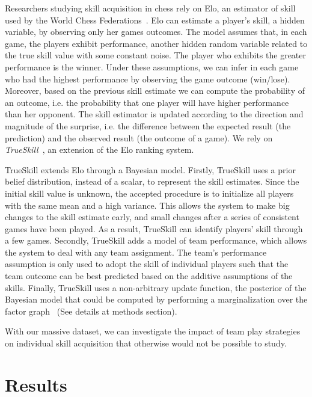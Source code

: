\documentclass[a4paper,10pt]{book}
\theoremstyle{definition}
\begin{document}
Researchers studying skill acquisition in chess rely on Elo, an estimator of skill used by the World Chess Federations~\cite{glickman1995-guideToChessRatings,glickman2001}.
Elo can estimate a player's skill, a hidden variable, by observing only her games outcomes.
The model assumes that, in each game, the players exhibit performance, another hidden random variable related to the true skill value with some constant noise.
The player who exhibits the greater performance is the winner.
Under these assumptions, we can infer in each game who had the highest performance by observing the game outcome (win/lose).
Moreover, based on the previous skill estimate we can compute the probability of an outcome, i.e. the probability that one player will have higher performance than her opponent.
The skill estimator is updated according to the direction and magnitude of the surprise, i.e. the difference between the expected result (the prediction) and the observed result (the outcome of a game).
We rely on \emph{TrueSkill}~\cite{Herbrich2007}, an extension of the Elo ranking system.

TrueSkill extends Elo through a Bayesian model.
Firstly, TrueSkill uses a prior belief distribution, instead of a scalar, to represent the skill estimates.
Since the initial skill value is unknown, the accepted procedure is to initialize all players with the same mean and a high variance.
This allows the system to make big changes to the skill estimate early, and small changes after a series of consistent games have been played.
As a result, TrueSkill can identify players' skill through a few games.
Secondly, TrueSkill adds a model of team performance, which allows the system to deal with any team assignment.
The team's performance assumption is only used to adopt the skill of individual players such that the team outcome can be best predicted based on the additive assumptions of the skills.
Finally, TrueSkill uses a non-arbitrary update function, the posterior of the Bayesian model that could be computed by performing a marginalization over the factor graph~\cite{Kschischang2001} (See details at methods section).

With our massive dataset, we can investigate the impact of team play strategies on individual skill acquisition that otherwise would not be possible to study.

\section{Results}
\end{document}
